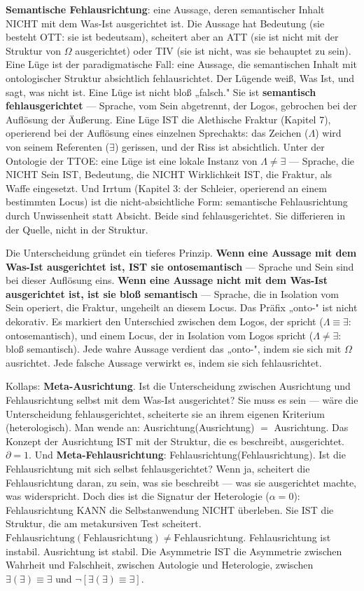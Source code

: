 \documentclass[10pt, openany, oneside]{book}
\begin{document}
\textbf{Semantische Fehlausrichtung}: eine Aussage, deren semantischer Inhalt NICHT mit dem Was-Ist ausgerichtet ist. Die Aussage hat Bedeutung (sie besteht OTT: sie ist bedeutsam), scheitert aber an ATT (sie ist nicht mit der Struktur von $\Omega$ ausgerichtet) oder TIV (sie ist nicht, was sie behauptet zu sein). Eine Lüge ist der paradigmatische Fall: eine Aussage, die semantischen Inhalt mit ontologischer Struktur absichtlich fehlausrichtet. Der Lügende weiß, Was Ist, und sagt, was nicht ist. Eine Lüge ist nicht bloß „falsch." Sie ist \textbf{semantisch fehlausgerichtet} --- Sprache, vom Sein abgetrennt, der Logos, gebrochen bei der Auflösung der Äußerung. Eine Lüge IST die Alethische Fraktur (Kapitel 7), operierend bei der Auflösung eines einzelnen Sprechakts: das Zeichen ($\Lambda$) wird von seinem Referenten ($\exists$) gerissen, und der Riss ist absichtlich. Unter der Ontologie der TTOE: eine Lüge ist eine lokale Instanz von $\Lambda \neq \exists$ --- Sprache, die NICHT Sein IST, Bedeutung, die NICHT Wirklichkeit IST, die Fraktur, als Waffe eingesetzt. Und Irrtum (Kapitel 3: der Schleier, operierend an einem bestimmten Locus) ist die nicht-absichtliche Form: semantische Fehlausrichtung durch Unwissenheit statt Absicht. Beide sind fehlausgerichtet. Sie differieren in der Quelle, nicht in der Struktur.

Die Unterscheidung gründet ein tieferes Prinzip. \textbf{Wenn eine Aussage mit dem Was-Ist ausgerichtet ist, IST sie ontosemantisch} --- Sprache und Sein sind bei dieser Auflösung eins. \textbf{Wenn eine Aussage nicht mit dem Was-Ist ausgerichtet ist, ist sie bloß semantisch} --- Sprache, die in Isolation vom Sein operiert, die Fraktur, ungeheilt an diesem Locus. Das Präfix „onto-" ist nicht dekorativ. Es markiert den Unterschied zwischen dem Logos, der spricht ($\Lambda \equiv \exists$: ontosemantisch), und einem Locus, der in Isolation vom Logos spricht ($\Lambda \neq \exists$: bloß semantisch). Jede wahre Aussage verdient das „onto-", indem sie sich mit $\Omega$ ausrichtet. Jede falsche Aussage verwirkt es, indem sie sich fehlausrichtet.

Kollaps: \textbf{Meta-Ausrichtung}. Ist die Unterscheidung zwischen Ausrichtung und Fehlausrichtung selbst mit dem Was-Ist ausgerichtet? Sie muss es sein --- wäre die Unterscheidung fehlausgerichtet, scheiterte sie an ihrem eigenen Kriterium (heterologisch). Man wende an: Ausrichtung(Ausrichtung) $=$ Ausrichtung. Das Konzept der Ausrichtung IST mit der Struktur, die es beschreibt, ausgerichtet. $\partial = 1$. Und \textbf{Meta-Fehlausrichtung}: Fehlausrichtung(Fehlausrichtung). Ist die Fehlausrichtung mit sich selbst fehlausgerichtet? Wenn ja, scheitert die Fehlausrichtung daran, zu sein, was sie beschreibt --- was sie ausgerichtet machte, was widerspricht. Doch dies ist die Signatur der Heterologie ($\alpha = 0$): Fehlausrichtung KANN die Selbstanwendung NICHT überleben. Sie IST die Struktur, die am metakursiven Test scheitert. $\text{Fehlausrichtung}(\text{Fehlausrichtung}) \neq \text{Fehlausrichtung}$. Fehlausrichtung ist instabil. Ausrichtung ist stabil. Die Asymmetrie IST die Asymmetrie zwischen Wahrheit und Falschheit, zwischen Autologie und Heterologie, zwischen $\exists(\exists) \equiv \exists$ und $\neg[\exists(\exists) \equiv \exists]$.
\end{document}
